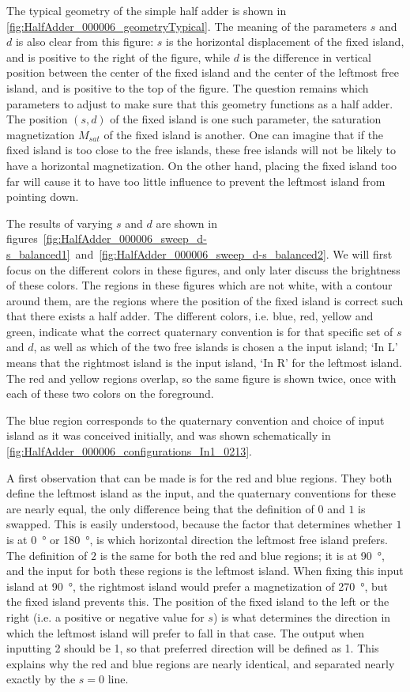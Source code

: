 \documentclass[11pt,a4paper,english]{article}
\begin{document}
The typical geometry of the simple half adder is shown in \cref{fig:HalfAdder_000006_geometryTypical}. The meaning of the parameters $s$ and $d$ is also clear from this figure: $s$ is the horizontal displacement of the fixed island, and is positive to the right of the figure, while $d$ is the difference in vertical position between the center of the fixed island and the center of the leftmost free island, and is positive to the top of the figure. The question remains which parameters to adjust to make sure that this geometry functions as a half adder. The position $(s,d)$ of the fixed island is one such parameter, the saturation magnetization $M_{sat}$ of the fixed island is another. One can imagine that if the fixed island is too close to the free islands, these free islands will not be likely to have a horizontal magnetization. On the other hand, placing the fixed island too far will cause it to have too little influence to prevent the leftmost island from pointing down. \par
The results of varying $s$ and $d$ are shown in figures~\ref{fig:HalfAdder_000006_sweep_d-s_balanced1}~and~\ref{fig:HalfAdder_000006_sweep_d-s_balanced2}. We will first focus on the different colors in these figures, and only later discuss the brightness of these colors. The regions in these figures which are not white, with a contour around them, are the regions where the position of the fixed island is correct such that there exists a half adder. The different colors, i.e. blue, red, yellow and green, indicate what the correct quaternary convention is for that specific set of $s$ and $d$, as well as which of the two free islands is chosen a the input island; `In L' means that the rightmost island is the input island, `In R' for the leftmost island. The red and yellow regions overlap, so the same figure is shown twice, once with each of these two colors on the foreground. \par
The blue region corresponds to the quaternary convention and choice of input island as it was conceived initially, and was shown schematically in \cref{fig:HalfAdder_000006_configurations_In1_0213}. \par
A first observation that can be made is for the red and blue regions. They both define the leftmost island as the input, and the quaternary conventions for these are nearly equal, the only difference being that the definition of $0$ and $1$ is swapped. This is easily understood, because the factor that determines whether $1$ is at \SI{0}{\degree} or \SI{180}{\degree}, is which horizontal direction the leftmost free island prefers. The definition of $2$ is the same for both the red and blue regions; it is at \SI{90}{\degree}, and the input for both these regions is the leftmost island. When fixing this input island at \SI{90}{\degree}, the rightmost island would prefer a magnetization of \SI{270}{\degree}, but the fixed island prevents this. The position of the fixed island to the left or the right (i.e. a positive or negative value for $s$) is what determines the direction in which the leftmost island will prefer to fall in that case. The output when inputting 2 should be 1, so that preferred direction will be defined as 1. This explains why the red and blue regions are nearly identical, and separated nearly exactly by the $s=0$ line. 
\end{document}
